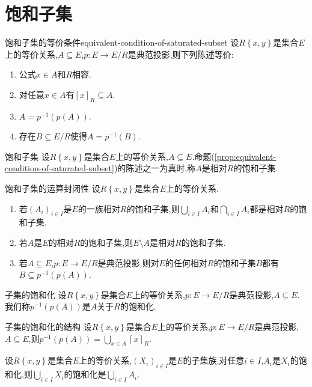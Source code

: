 \section{饱和子集}

\begin{proposition}{饱和子集的等价条件}{equivalent-condition-of-saturated-subset}
	设$R\left\{x,y\right\}$是集合$E$上的等价关系,$A\subseteq E$,$p:E\to E/R$是典范投影,则下列陈述等价:
	\begin{enumerate}
		\item 公式$x\in A$和$R$相容.
		\item 对任意$x\in A$有$\left[x\right]_{R}\subseteq A$.
		\item $A=p^{-1}\left(p\left(A\right)\right)$.
		\item 存在$B\subseteq E/R$使得$A=p^{-1}\left(B\right)$.
	\end{enumerate}
\end{proposition}

\begin{definition}{饱和子集}{}
	设$R\left\{x,y\right\}$是集合$E$上的等价关系,$A\subseteq E$.命题(\ref{prop:equivalent-condition-of-saturated-subset})的陈述之一为真时,称$A$是相对$R$的饱和子集.
\end{definition}

\begin{proposition}{饱和子集的运算封闭性}{}
	设$R\left\{x,y\right\}$是集合$E$上的等价关系.
	\begin{enumerate}
		\item 若$\left(A_{i}\right)_{i\in I}$是$E$的一族相对$R$的饱和子集,则$\bigcup\limits_{i\in I}A_{i}$和$\bigcap\limits_{i\in I}A_{i}$都是相对$R$的饱和子集.
		\item 若$A$是$E$的相对$R$的饱和子集,则$E\setminus A$是相对$R$的饱和子集.
		\item 若$A\subseteq E$,$p:E\to E/R$是典范投影,则对$E$的任何相对$R$的饱和子集$B$都有$B\subseteq p^{-1}\left(p\left(A\right)\right)$.
	\end{enumerate}
\end{proposition}

\begin{definition}{子集的饱和化}{}
	设$R\left\{x,y\right\}$是集合$E$上的等价关系,$p:E\to E/R$是典范投影,$A\subseteq E$.我们称$p^{-1}\left(p\left(A\right)\right)$是$A$关于$R$的饱和化.
\end{definition}

\begin{proposition}{子集的饱和化的结构}{}
	设$R\left\{x,y\right\}$是集合$E$上的等价关系,$p:E\to E/R$是典范投影,$A\subseteq E$,则$p^{-1}\left(p\left(A\right)\right)=\bigcup\limits_{x\in A}\left[x\right]_{R}$.
\end{proposition}

\begin{proposition}{}{}
	设$R\left\{x,y\right\}$是集合$E$上的等价关系,$\left(X_{i}\right)_{i\in I}$是$E$的子集族,对任意$i\in I$,$A_{i}$是$X_{i}$的饱和化,则$\bigcup\limits_{i\in I}X_{i}$的饱和化是$\bigcup\limits_{i\in I}A_{i}$.
\end{proposition}







